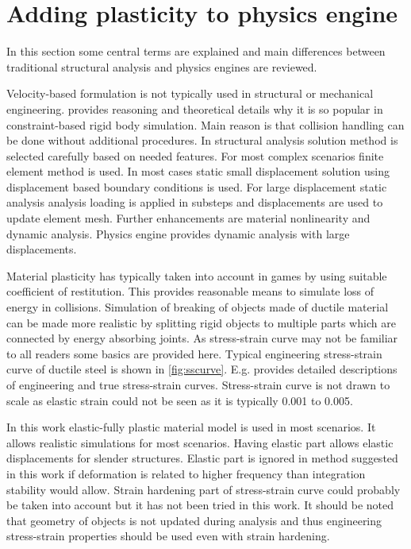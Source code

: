 \section{Adding plasticity to physics engine}

In this section some central terms are explained and main differences between traditional structural 
analysis and physics engines are reviewed.

Velocity-based formulation is not typically used in structural or mechanical engineering.
 \citet[p.~45]{erleben.thesis} provides reasoning and theoretical details why it is so popular in 
constraint-based rigid body simulation. 
Main reason is that collision handling can be done without additional procedures.
In structural analysis solution method is selected carefully based on needed features.
For most complex scenarios finite element method is used.
In most cases static small displacement solution using displacement based boundary conditions is used.
For large displacement static analysis analysis loading is applied in substeps and 
displacements are used to update element mesh.
Further enhancements are material nonlinearity and dynamic analysis.
Physics engine provides dynamic analysis with large displacements.

Material plasticity has typically taken into account in games by using suitable coefficient of restitution.
This provides reasonable means to simulate loss of energy in collisions.
Simulation of breaking of objects made of ductile material can be made more realistic by splitting rigid objects
to multiple parts which are connected by energy absorbing joints.
As stress-strain curve may not be familiar to all readers some basics are provided here.
Typical engineering stress-strain curve of ductile steel is shown in \ref{fig:sscurve}.
E.g. \citet{dowling} provides detailed descriptions of engineering and true stress-strain curves.
Stress-strain curve is not drawn to scale as elastic strain could not be seen as it is typically 0.001 to 0.005.

In this work elastic-fully plastic material model is used in most scenarios.
It allows realistic simulations for most scenarios.
Having elastic part allows elastic displacements for slender structures. 
Elastic part is ignored in method suggested in this work if deformation is related
to higher frequency than integration stability would allow.
Strain hardening part of stress-strain curve could probably be taken into account but it has not been tried in this work.
It should be noted that geometry
of objects is not updated during analysis and thus engineering stress-strain properties should
be used even with strain hardening.

